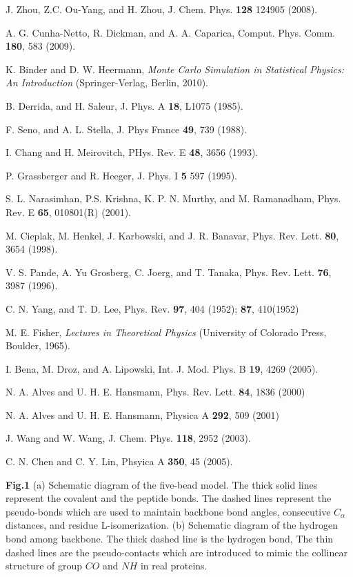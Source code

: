 \documentclass[preprint,preprintnumbers,amsmath,amssymb,showpacs,aps,pre]{revtex4-1}
\begin{document}
\begin{thebibliography}{10}
J. Zhou, Z.C. Ou-Yang, and H. Zhou, J. Chem. Phys. {\bf 128}
124905 (2008).

A. G. Cunha-Netto, R. Dickman, and A. A. Caparica, Comput. Phys. Comm.
{\bf 180}, 583 (2009).

K. Binder and D. W. Heermann, {\it Monte Carlo Simulation in
Statistical Physics: An Introduction} (Springer-Verlag, Berlin, 2010).

B. Derrida, and H. Saleur, J. Phys. A {\bf 18}, L1075 (1985).

F. Seno, and A. L. Stella, J. Phys France {\bf 49}, 739 (1988).

I. Chang and H. Meirovitch, PHys. Rev. E {\bf 48}, 3656 (1993).

P. Grassberger and R. Heeger, J. Phys. I {\bf 5} 597 (1995).

S. L. Narasimhan, P.S. Krishna, K. P. N. Murthy, and M. Ramanadham,
Phys. Rev. E {\bf 65}, 010801(R) (2001).

M. Cieplak, M. Henkel, J. Karbowski, and J. R. Banavar,
Phys. Rev. Lett. {\bf 80}, 3654 (1998).

V. S. Pande, A. Yu Grosberg, C. Joerg, and T. Tanaka,
Phys. Rev. Lett. {\bf 76}, 3987 (1996).

C. N. Yang, and T. D. Lee, Phys. Rev. {\bf 97}, 404 (1952); 
{\bf 87}, 410(1952)

M. E. Fisher, {\it Lectures in Theoretical Physics} (University of Colorado
Press, Boulder, 1965).

I. Bena, M. Droz, and A. Lipowski, Int. J. Mod. Phys. B {\bf 19},
4269 (2005).

N. A. Alves and U. H. E. Hansmann, Phys. Rev. Lett. {\bf 84}, 1836 (2000)

N. A. Alves and U. H. E. Hansmann, Physica A {\bf 292}, 509 (2001)

J. Wang and W. Wang, J. Chem. Phys. {\bf 118}, 2952 (2003).

C. N. Chen and C. Y. Lin, Phsyica A {\bf 350}, 45 (2005).

\end{thebibliography}

\newpage
\vspace{0.5cm}
\parindent 0pt {\large {\bf Fig.1}}
(a) Schematic diagram of the five-bead model. The thick solid lines
represent the covalent and the peptide bonds. The dashed lines
represent the pseudo-bonds which are used to maintain backbone bond
angles, consecutive $C_{\alpha}$ distances, and residue
L-isomerization. (b) Schematic diagram of the hydrogen bond among
backbone. The thick dashed line is the hydrogen bond, The thin
dashed lines are the pseudo-contacts which are introduced to mimic
the collinear structure of group $CO$ and $NH$ in real proteins.
\end{document}
